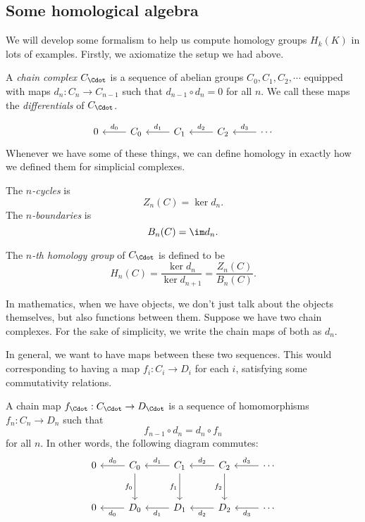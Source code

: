 \documentclass[a4paper]{article}
\begin{document}
\subsection{Some homological algebra}
We will develop some formalism to help us compute homology groups $H_k(K)$ in lots of examples. Firstly, we axiomatize the setup we had above.
\begin{defi}
  A \emph{chain complex} $C_{\Cdot}$ is a sequence of abelian groups $C_0, C_1, C_2, \cdots$ equipped with maps $d_n: C_n \to C_{n - 1}$ such that $d_{n - 1} \circ d_n = 0$ for all $n$. We call these maps the \emph{differentials} of $C_{\Cdot}$.
\end{defi}
\[
  \begin{tikzcd}
    0 & C_0 \ar[l, "d_0"'] & C_1 \ar [l, "d_1"'] & C_2 \ar [l, "d_2"'] & \cdots \ar [l, "d_3"']
  \end{tikzcd}
\]
Whenever we have some of these things, we can define homology in exactly how we defined them for simplicial complexes.

\begin{defi}
  The \emph{$n$-cycles} is
  \[
    Z_n(C) = \ker d_n.
  \]
  The \emph{$n$-boundaries} is
  \[
    B_n(C) = \im d_n.
  \]
\end{defi}

\begin{defi}
  The \emph{$n$-th homology group} of $C_{\Cdot}$ is defined to be
  \[
    H_n(C) = \frac{\ker d_n}{\ker d_{n + 1}} = \frac{Z_n(C)}{B_n(C)}.
  \]
\end{defi}

In mathematics, when we have objects, we don't just talk about the objects themselves, but also functions between them. Suppose we have two chain complexes. For the sake of simplicity, we write the chain maps of both as $d_n$.

In general, we want to have maps between these two sequences. This would corresponding to having a map $f_i: C_i \to D_i$ for each $i$, satisfying some commutativity relations.

\begin{defi}
  A chain map $f_{\Cdot}: C_{\Cdot}\to D_{\Cdot}$ is a sequence of homomorphisms $f_n: C_n \to D_n$ such that
  \[
    f_{n - 1} \circ d_n = d_n \circ f_n
  \]
  for all $n$. In other words, the following diagram commutes:
  \[
    \begin{tikzcd}[row sep=large]
      0 & C_0 \ar[l, "d_0"'] \ar[d, "f_0"'] & C_1 \ar [l, "d_1"'] \ar[d, "f_1"'] & C_2 \ar [l, "d_2"'] \ar [d, "f_2"'] & \cdots \ar [l, "d_3"']\\
      0 & D_0 \ar[l, "d_0"] & D_1 \ar [l, "d_1"] & D_2 \ar [l, "d_2"] & \cdots \ar [l, "d_3"]
    \end{tikzcd}
  \]
\end{defi}
\end{document}
